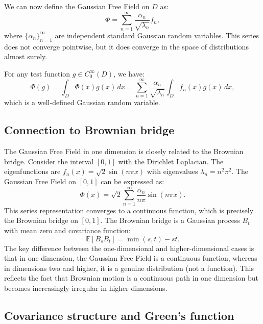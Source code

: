 \documentclass[letterpaper,11pt,oneside,reqno]{book}
\numberwithin{equation}{chapter}  %
\theoremstyle{definition}
\begin{document}
We can now define the Gaussian Free Field on $D$ as:
\begin{equation}
    \Phi = \sum_{n=1}^{\infty} \frac{\alpha_n}{\sqrt{\lambda_n}} f_n,
\end{equation}
where $\{\alpha_n\}_{n=1}^{\infty}$ are independent standard Gaussian random variables. This series does not converge pointwise, but it does converge in the space of distributions almost surely.

For any test function $g \in C_0^{\infty}(D)$, we have:
\begin{equation}
    \Phi(g) = \int_D \Phi(x) g(x) \, dx = \sum_{n=1}^{\infty} \frac{\alpha_n}{\sqrt{\lambda_n}} \int_D f_n(x) g(x) \, dx,
\end{equation}
which is a well-defined Gaussian random variable.

\subsection{Connection to Brownian bridge}

The Gaussian Free Field in one dimension is closely related to the Brownian bridge. Consider the interval $[0,1]$ with the Dirichlet Laplacian. The eigenfunctions are $f_n(x) = \sqrt{2} \sin(n\pi x)$ with eigenvalues $\lambda_n = n^2 \pi^2$. The Gaussian Free Field on $[0,1]$ can be expressed as:
\begin{equation}
	\label{lecture9:eq:Phi_1d}
    \Phi(x) = \sqrt{2} \sum_{n=1}^{\infty} \frac{\alpha_n}{n\pi} \sin(n\pi x).
\end{equation}
This series representation converges to a continuous function, which is precisely the Brownian bridge on $[0,1]$. The Brownian bridge is a Gaussian process $B_t$ with mean zero and covariance function:
\begin{equation}
	\label{lecture9:eq:covariance_1d}
    \mathbb{E}[B_s B_t] = \min(s, t) - st.
\end{equation}
The key difference between the one-dimensional and higher-dimensional cases is that in one dimension, the Gaussian Free Field is a continuous function, whereas in dimensions two and higher, it is a genuine distribution (not a function). This reflects the fact that Brownian motion is a continuous path in one dimension but becomes increasingly irregular in higher dimensions.

\subsection{Covariance structure and Green's function}
\end{document}
